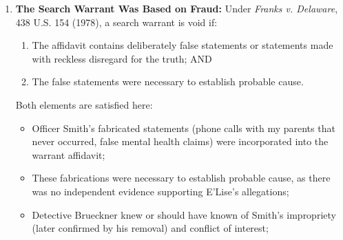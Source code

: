 \documentclass[12pt,letterpaper]{article}
\begin{document}
\begin{enumerate}
\begin{itemize}
\item \textbf{As Missoula Police Detective:} She had authority to seek search warrants, present evidence to judges, and coordinate with other officers (including the already-compromised Officer Smith).

\item \textbf{Leveraging Both Positions:} She could use the reputation and credibility of both YWCA (a respected nonprofit serving domestic violence victims) and Missoula Police Department (law enforcement authority) to present a compelling but fraudulent case to the issuing judge.

\item \textbf{Dual Institutional Weight:} A judge reviewing the warrant application would see: (1) a domestic violence services organization (YWCA) supporting the allegations; and (2) law enforcement (Missoula PD) vouching for the evidence---without knowing that the same person (Brueckner) sat on both sides and had an irreconcilable conflict of interest.
\end{itemize}

\item \textbf{The Search Warrant Was Based on Fraud:} Under \textit{Franks v. Delaware}, 438 U.S. 154 (1978), a search warrant is void if:

\begin{enumerate}
\item The affidavit contains deliberately false statements or statements made with reckless disregard for the truth; AND

\item The false statements were necessary to establish probable cause.
\end{enumerate}

Both elements are satisfied here:

\begin{itemize}
\item Officer Smith's fabricated statements (phone calls with my parents that never occurred, false mental health claims) were incorporated into the warrant affidavit;

\item These fabrications were necessary to establish probable cause, as there was no independent evidence supporting E'Lise's allegations;

\item Detective Brueckner knew or should have known of Smith's impropriety (later confirmed by his removal) and conflict of interest;


\end{itemize}
\end{enumerate}
\end{document}

